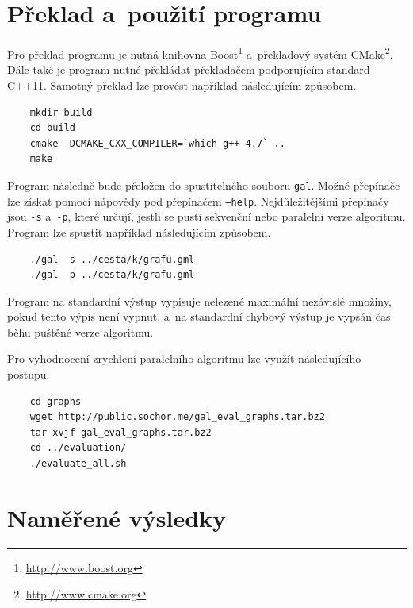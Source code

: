 \documentclass[12pt]{article}
\begin{document}
\pagebreak

\appendix
\section{Překlad a~použití programu} \label{appendix:ProgramUsage}
Pro překlad programu je nutná knihovna Boost\footnote{\url{http://www.boost.org}} a~překladový systém CMake\footnote{\url{http://www.cmake.org}}. Dále také je program nutné překládat překladačem podporujícím standard C++11. Samotný překlad lze provést například následujícím způsobem.
\begin{verbatim}
    mkdir build
    cd build
    cmake -DCMAKE_CXX_COMPILER=`which g++-4.7` ..
    make
\end{verbatim}

Program následně bude přeložen do spustitelného souboru \texttt{gal}. Možné přepínače lze získat pomocí nápovědy pod přepínačem \texttt{--help}. Nejdůležitějšími přepínačy jsou \texttt{-s} a~\texttt{-p}, které určují, jestli se pustí sekvenční nebo paralelní verze algoritmu. Program lze spustit například následujícím způsobem.
\begin{verbatim}
    ./gal -s ../cesta/k/grafu.gml
    ./gal -p ../cesta/k/grafu.gml
\end{verbatim}

Program na standardní výstup vypisuje nelezené maximální nezávislé množiny, pokud tento výpis není vypnut, a~na standardní chybový výstup je vypsán čas běhu puštěné verze algoritmu. 


Pro vyhodnocení zrychlení paralelního algoritmu lze využít následujícího postupu.
\begin{verbatim}
    cd graphs
    wget http://public.sochor.me/gal_eval_graphs.tar.bz2
    tar xvjf gal_eval_graphs.tar.bz2
    cd ../evaluation/
    ./evaluate_all.sh
\end{verbatim}



\section{Naměřené výsledky} \label{appendix:RawResults}
\end{document}
